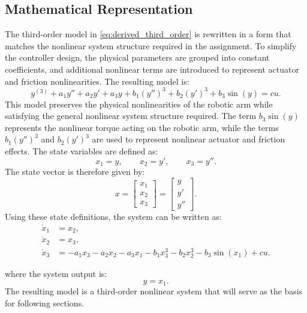 \subsection{Mathematical Representation}

The third-order model in \eqref{eq:derived_third_order} is rewritten in a form that matches the nonlinear system structure required in the assignment. To simplify the controller design, the physical parameters are grouped into constant coefficients, and additional nonlinear terms are introduced to represent actuator and friction nonlinearities. The resulting model is:
\begin{equation}
y^{(3)}
+a_1y''
+a_2y'
+a_3y
+b_1(y'')^3
+b_2(y')^3
+b_3\sin(y)
=
cu .
\label{eq:control_oriented_model}
\end{equation}
This model preserves the physical nonlinearities of the robotic arm while satisfying the general nonlinear system structure required. The term \(b_3\sin(y)\) represents the nonlinear torque acting on the robotic arm, while the terms \(b_1(y'')^3\) and \(b_2(y')^3\) are used to represent nonlinear actuator and friction effects. The state variables are defined as:
\begin{equation}
x_1=y,
\qquad
x_2=y',
\qquad
x_3=y''.
\end{equation}
The state vector is therefore given by:
\begin{equation}
x=
\begin{bmatrix}
x_1\\
x_2\\
x_3
\end{bmatrix}
=
\begin{bmatrix}
y\\
y'\\
y''
\end{bmatrix}.
\end{equation}
Using these state definitions, the system can be written as:
\begin{align}
\dot{x}_1 &= x_2,\\
\dot{x}_2 &= x_3,\\
\dot{x}_3 &=
-a_1x_3
-a_2x_2
-a_3x_1
-b_1x_3^3
-b_2x_2^3
-b_3\sin(x_1)
+cu.
\end{align}

where the system output is:
\begin{equation}
y=x_1.
\end{equation}
The resulting model is a third-order nonlinear system that will serve as the basis for following sections.

\bigskip